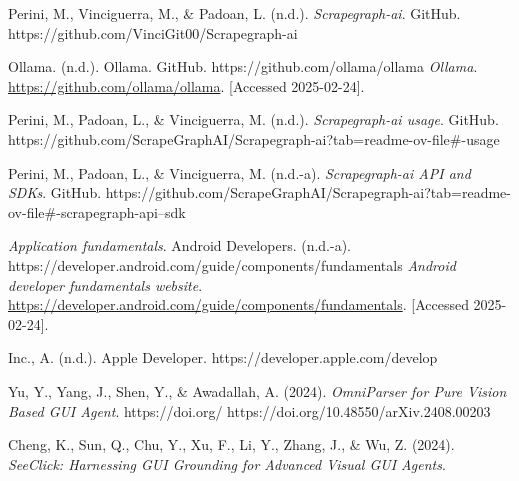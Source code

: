\documentclass[licencjacka,en]{pracamgr}
\begin{document}
\begin{thebibliography}{99}
Perini, M., Vinciguerra, M., \& Padoan, L. (n.d.). \textit{Scrapegraph-ai}. GitHub. https://github.com/VinciGit00/Scrapegraph-ai

 Ollama. (n.d.). Ollama. GitHub. https://github.com/ollama/ollama
\textit{Ollama}.
\url{https://github.com/ollama/ollama}.
[Accessed 2025-02-24].

Perini, M., Padoan, L., \& Vinciguerra, M. (n.d.). \textit{Scrapegraph-ai usage}. GitHub. https://github.com/ScrapeGraphAI/Scrapegraph-ai?tab=readme-ov-file\#-usage

Perini, M., Padoan, L., \& Vinciguerra, M. (n.d.-a). \textit{Scrapegraph-ai API and SDKs}. GitHub. https://github.com/ScrapeGraphAI/Scrapegraph-ai?tab=readme-ov-file\#-scrapegraph-api--sdk

\textit{Application fundamentals}. Android Developers. (n.d.-a). https://developer.android.com/guide/components/fundamentals
\textit{Android developer fundamentals website}.
\url{https://developer.android.com/guide/components/fundamentals}.
[Accessed 2025-02-24].

Inc., A. (n.d.). Apple Developer. https://developer.apple.com/develop

Yu, Y., Yang, J., Shen, Y., \& Awadallah, A. (2024). \textit{OmniParser for Pure Vision Based GUI Agent}. https://doi.org/ https://doi.org/10.48550/arXiv.2408.00203

Cheng, K., Sun, Q., Chu, Y., Xu, F., Li, Y., Zhang, J., \& Wu, Z. (2024). \textit{SeeClick: Harnessing GUI Grounding for Advanced Visual GUI Agents}.


\end{thebibliography}
\end{document}
